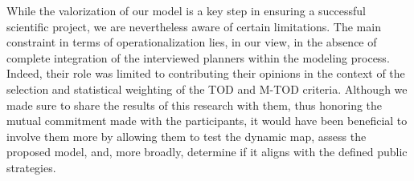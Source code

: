 \begin{refsegment}
While the valorization of our model is a key step in ensuring a successful scientific project, we are nevertheless aware of certain limitations. The main constraint in terms of operationalization lies, in our view, in the absence of complete integration of the interviewed planners within the modeling process. Indeed, their role was limited to contributing their opinions in the context of the selection and statistical weighting of the \acrshort{TOD} and \acrshort{M-TOD} criteria. Although we made sure to share the results of this research with them, thus honoring the mutual commitment made with the participants, it would have been beneficial to involve them more by allowing them to test the dynamic map, assess the proposed model, and, more broadly, determine if it aligns with the defined public strategies.%


\end{refsegment}
